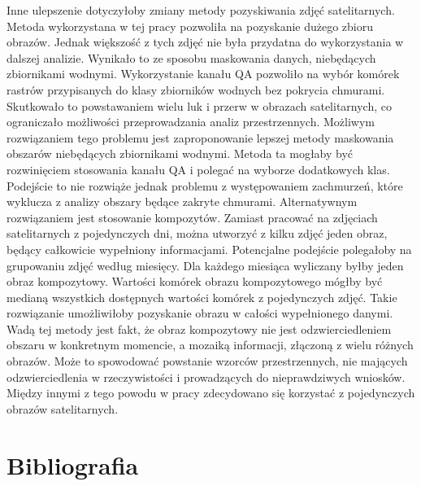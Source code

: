 \documentclass{amuthesis}
\begin{document}
Inne ulepszenie dotyczyłoby zmiany metody pozyskiwania zdjęć
satelitarnych. Metoda wykorzystana w tej pracy pozwoliła na pozyskanie
dużego zbioru obrazów. Jednak większość z tych zdjęć nie była przydatna
do wykorzystania w dalszej analizie. Wynikało to ze sposobu maskowania
danych, niebędących zbiornikami wodnymi. Wykorzystanie kanału QA
pozwoliło na wybór komórek rastrów przypisanych do klasy zbiorników
wodnych bez pokrycia chmurami. Skutkowało to powstawaniem wielu luk i
przerw w obrazach satelitarnych, co ograniczało możliwości
przeprowadzania analiz przestrzennych. Możliwym rozwiązaniem tego
problemu jest zaproponowanie lepszej metody maskowania obszarów
niebędących zbiornikami wodnymi. Metoda ta mogłaby być rozwinięciem
stosowania kanału QA i polegać na wyborze dodatkowych klas. Podejście to
nie rozwiąże jednak problemu z występowaniem zachmurzeń, które wyklucza
z analizy obszary będące zakryte chmurami. Alternatywnym rozwiązaniem
jest stosowanie kompozytów. Zamiast pracować na zdjęciach satelitarnych
z pojedynczych dni, można utworzyć z kilku zdjęć jeden obraz, będący
całkowicie wypełniony informacjami. Potencjalne podejście polegałoby na
grupowaniu zdjęć według miesięcy. Dla każdego miesiąca wyliczany byłby
jeden obraz kompozytowy. Wartości komórek obrazu kompozytowego mógłby
być medianą wszystkich dostępnych wartości komórek z pojedynczych zdjęć.
Takie rozwiązanie umożliwiłoby pozyskanie obrazu w całości wypełnionego
danymi. Wadą tej metody jest fakt, że obraz kompozytowy nie jest
odzwierciedleniem obszaru w konkretnym momencie, a mozaiką informacji,
złączoną z wielu różnych obrazów. Może to spowodować powstanie wzorców
przestrzennych, nie mających odzwierciedlenia w rzeczywistości i
prowadzących do nieprawdziwych wniosków. Między innymi z tego powodu w
pracy zdecydowano się korzystać z pojedynczych obrazów satelitarnych.


\hypertarget{bibliografia}{%
\chapter*{Bibliografia}\label{bibliografia}}


\printbibliography[heading=none]

\end{document}

